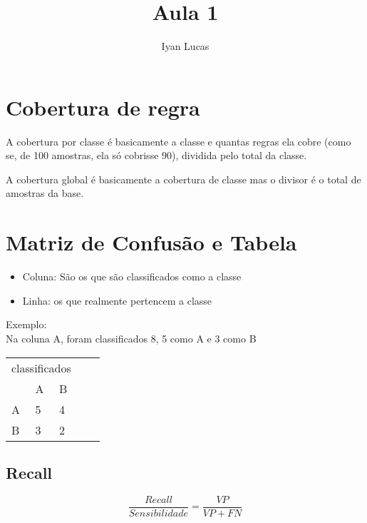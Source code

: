 \documentclass[oneside]{article}            %
\title{Aula 1}
\author{Iyan Lucas}
\begin{document}
    \maketitle

\section{Cobertura de regra}

A cobertura por classe é basicamente a classe e quantas regras ela cobre (como se, de 100 amostras, ela só cobrisse 90), dividida pelo total da classe. 

A cobertura global é basicamente a cobertura de classe mas o divisor é o total de amostras da base.

\section{Matriz de Confusão e Tabela}

    \begin{itemize}
        \item Coluna: São os que são classificados como a classe
        \item Linha: os que realmente pertencem a classe
    \end{itemize}
    Exemplo:\\
    Na coluna A, foram classificados 8, 5 como A e 3 como B
    \begin{table}[h]
        \begin{tabular}{|lll|ll}
        \cline{1-3}
        \multicolumn{3}{|l|}{classificados}                  &  &  \\ \cline{1-3}
        \multicolumn{1}{|l|}{}  & \multicolumn{1}{l|}{A} & B &  &  \\ \cline{1-3}
        \multicolumn{1}{|l|}{A} & \multicolumn{1}{l|}{5} & 4 &  &  \\ \cline{1-3}
        \multicolumn{1}{|l|}{B} & \multicolumn{1}{l|}{3} & 2 &  &  \\ \cline{1-3}
        \end{tabular}
        \end{table}


\subsection{Recall}
\begin{equation}
    \displaystyle\frac{Recall}{Sensibilidade} = \frac{VP}{VP+FN}
\end{equation}
\end{document}
